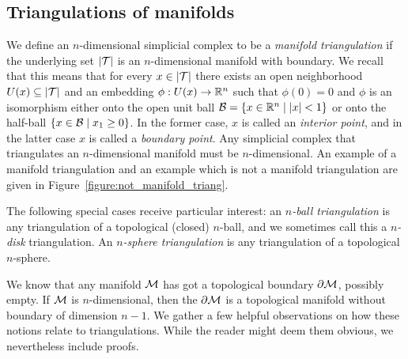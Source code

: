 \documentclass[10pt,a4paper]{article}
\newcommand{\mwl}[1]{{\color{red}#1}}
\begin{document}
\subsection{Triangulations of manifolds}

We define an $n$-dimensional simplicial complex to be a \emph{manifold triangulation} if the underlying set $\left| {\mathcal T} \right|$ is an $n$-dimensional manifold with boundary.
We recall that this means that for every $x \in \left| {\mathcal T} \right|$
there exists an open neighborhood $U(x) \subseteq \left| {\mathcal T} \right|$ and an embedding $\phi : U(x) \rightarrow {\mathbb R}^{n}$
such that $\phi(0) = 0$ and $\phi$ is an isomorphism either onto the open unit ball $\calB = \{ x \in \bbR^{n} \suchthat |x| < 1 \}$
or onto the half-ball $\{ x \in \calB \suchthat x_1 \geq 0 \}$.
In the former case, $x$ is called an \emph{interior point}, and in the latter case $x$ is called a \emph{boundary point}. 
Any simplicial complex that triangulates an $n$-dimensional manifold must be $n$-dimensional. 
An example of a manifold triangulation and an example which is not a manifold triangulation are given in Figure~\ref{figure:not_manifold_triang}.

The following special cases receive particular interest:
an \textit{$n$-ball triangulation} is any triangulation of a topological (closed) $n$-ball\mwl{, and we sometimes call this a \textit{$n$-disk} triangulation}.
An \textit{$n$-sphere triangulation} is any triangulation of a topological $n$-sphere. 


We know that any manifold ${\mathcal M}$ has got a topological boundary $\partial{\mathcal M}$, possibly empty. 
If ${\mathcal M}$ is $n$-dimensional, then the $\partial{\mathcal M}$ is a topological manifold without boundary of dimension $n-1$. 
We gather a few helpful observations on how these notions relate to triangulations.
While the reader might deem them obvious, we nevertheless include proofs. 
\end{document}
